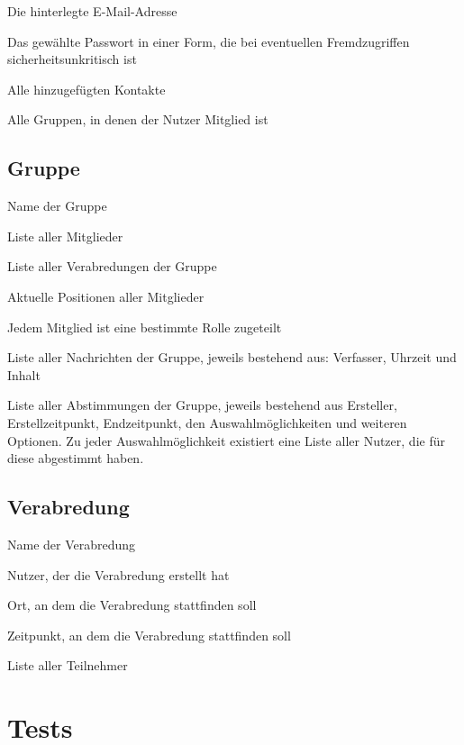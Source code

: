 \documentclass[parskip=full,11pt]{scrartcl}
\begin{document}
Die hinterlegte E-Mail-Adresse

Das gewählte Passwort in einer Form, die bei eventuellen Fremdzugriffen sicherheitsunkritisch ist

Alle hinzugefügten Kontakte

Alle Gruppen, in denen der Nutzer Mitglied ist

\subsection{Gruppe}
Name der Gruppe

Liste aller Mitglieder

Liste aller Verabredungen der Gruppe

Aktuelle Positionen aller Mitglieder

Jedem Mitglied ist eine bestimmte Rolle zugeteilt

Liste aller Nachrichten der Gruppe, jeweils bestehend aus: Verfasser, Uhrzeit und Inhalt

Liste aller Abstimmungen der Gruppe, jeweils bestehend aus Ersteller, Erstellzeitpunkt, Endzeitpunkt, den Auswahlmöglichkeiten und weiteren Optionen. Zu jeder Auswahlmöglichkeit existiert eine Liste aller Nutzer, die für diese abgestimmt haben.

\subsection{Verabredung}
Name der Verabredung

Nutzer, der die Verabredung erstellt hat

Ort, an dem die Verabredung stattfinden soll

Zeitpunkt, an dem die Verabredung stattfinden soll

Liste aller Teilnehmer

\pagebreak
\section{Tests}
\end{document}
